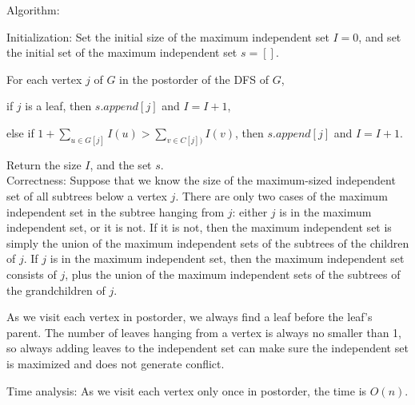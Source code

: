 \documentclass[11pt]{article} %
\begin{document}
\noindent
Algorithm: 

\noindent
Initialization: Set the initial size of the maximum independent set $I=0$, and set the initial set of the maximum independent set $s=[]$.

\noindent
For each vertex $j$ of $G$ in the postorder of the DFS of $G$, 

if $j$ is a leaf, then $s.append[j]$ and $I = I+1$, 

else if $1 + \sum_{u \in G[j]} I(u) > \sum_{v \in C[j]) } I(v)$, then $s.append[j]$ and $I = I+1$.

\noindent
Return the size $I$, and the set $s$.\\


Correctness: 
Suppose that we know the size of the maximum-sized independent set of all subtrees below a vertex $j$. There are only two cases of the maximum independent set in the subtree hanging from $j$: either $j$ is in the maximum independent set, or it is not. If it is not, then the maximum independent set is simply the union of the maximum independent sets of the subtrees of the children of $j$. If $j$ is in the maximum independent set, then the maximum independent set consists of $j$, plus the union of the maximum independent sets of the subtrees of the grandchildren of $j$. 

As we visit each vertex in postorder, we always find a leaf before the leaf's parent. The number of leaves hanging from a vertex is always no smaller than 1, so always adding leaves to the independent set can make sure the independent set is maximized and does not generate conflict.

Time analysis: As we visit each vertex only once in postorder, the time is $O(n)$.
\end{document}

